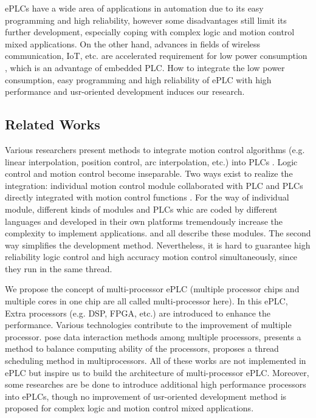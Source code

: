 \documentclass[journal,UTF8]{IEEEtran}
\begin{document}
ePLCs have a wide area of applications in automation due to its easy programming and high reliability, however some disadvantages \cite{Hossain2014Advanced} still limit its further development, especially coping with complex logic and motion control mixed applications. On the other hand, advances in fields of wireless communication, IoT, etc. are accelerated requirement for low power consumption \cite{Arshad2017Green}, which is an advantage of embedded PLC. How to integrate the low power consumption, easy programming and high reliability of ePLC with high performance and usr-oriented development induces our research.

\subsection{Related Works}
Various researchers present methods to integrate motion control algorithms (e.g. linear interpolation, position control, arc interpolation, etc.) into PLCs \cite{Ioannides2004Design,Shi2016The,Fang2017Design}. Logic control and motion control become inseparable. Two ways exist to realize the integration: individual motion control module collaborated with PLC \cite{Peng2011Linear} and PLCs directly integrated with motion control functions \cite{Ioannides2004Design,syaichu2011model}. For the way of individual module, different kinds of modules and PLCs whic are coded by different languages and developed in their own platforms tremendously increase the complexity to implement applications. \cite{Peng2011Linear,Qian2014A}  and \cite{Panasonic2011Programmable} all describe these modules. The second way simplifies the development method. Nevertheless, it is hard to guarantee high reliability logic control and high accuracy motion control simultaneously, since they run in the same thread. 

We propose the concept of multi-processor ePLC (multiple processor chips and multiple cores in one chip are all called multi-processor here). In this ePLC, Extra processors (e.g. DSP, FPGA, etc.) are introduced to enhance the performance. Various technologies contribute to the improvement of multiple processor. \cite{Dubois2002Memory,Patel2006Processor} pose data interaction methods among multiple processors, \cite{Zhu2016Providing} presents a method to balance computing ability of the processors, \cite{Albarakat2017MTB} proposes a thread scheduling method in multiprocessors. All of these works are not implemented in ePLC but inspire us to build the architecture of multi-processor ePLC. Moreover, some researches \cite{Hajduk2015Architecture} are be done to introduce additional high performance processors into ePLCs, though no improvement of usr-oriented development method is proposed for complex logic and motion control mixed applications.
\end{document}
